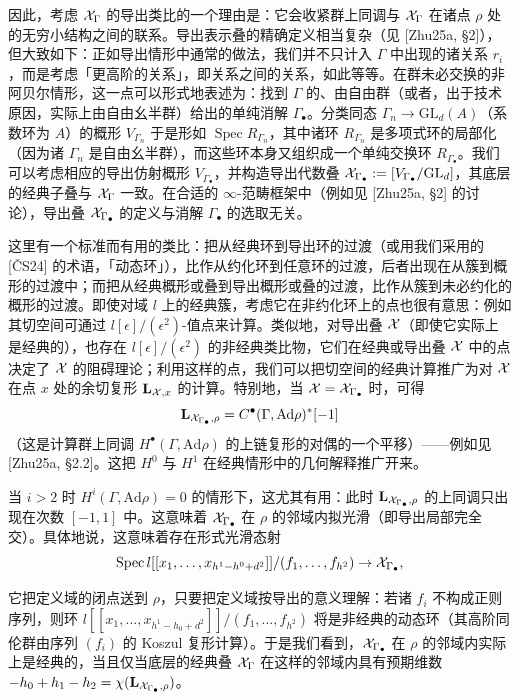 因此，考虑 $\mathcal{X}_\Gamma$ 的导出类比的一个理由是：它会收紧群上同调与 $\mathcal{X}_\Gamma$ 在诸点 $\rho$ 处的无穷小结构之间的联系。导出表示叠的精确定义相当复杂（见 [Zhu25a, §2]），但大致如下：正如导出情形中通常的做法，我们并不只计入 $\Gamma$ 中出现的诸关系 $r_i$，而是考虑「更高阶的关系」，即关系之间的关系，如此等等。在群未必交换的非阿贝尔情形，这一点可以形式地表述为：找到 $\Gamma$ 的、由自由群（或者，出于技术原因，实际上由自由幺半群）给出的单纯消解 $\Gamma_\bullet$。分类同态 $\Gamma_n\to\mathrm{GL}_d(A)$（系数环为 $A$）的概形 $V_{\Gamma_n}$ 于是形如 $\operatorname{Spec}R_{\Gamma_n}$，其中诸环 $R_{\Gamma_n}$ 是多项式环的局部化（因为诸 $\Gamma_n$ 是自由幺半群），而这些环本身又组织成一个单纯交换环 $R_{\Gamma_\bullet}$。我们可以考虑相应的导出仿射概形 $V_{\Gamma_\bullet}$，并构造导出代数叠 $\mathcal{X}_{\Gamma_\bullet}:=[V_{\Gamma_\bullet}/\mathrm{GL}_d]$，其底层的经典子叠与 $\mathcal{X}_\Gamma$ 一致。在合适的 $\infty$-范畴框架中（例如见 [Zhu25a, §2] 的讨论），导出叠 $\mathcal{X}_{\Gamma_\bullet}$ 的定义与消解 $\Gamma_\bullet$ 的选取无关。

这里有一个标准而有用的类比：把从经典环到导出环的过渡（或用我们采用的 [ČS24] 的术语，「动态环」），比作从约化环到任意环的过渡，后者出现在从簇到概形的过渡中；而把从经典概形或叠到导出概形或叠的过渡，比作从簇到未必约化的概形的过渡。即使对域 $l$ 上的经典簇，考虑它在非约化环上的点也很有意思：例如其切空间可通过 $l[\epsilon]/(\epsilon^2)$-值点来计算。类似地，对导出叠 $\mathcal{X}$（即使它实际上是经典的），也存在 $l[\epsilon]/(\epsilon^2)$ 的非经典类比物，它们在经典或导出叠 $\mathcal{X}$ 中的点决定了 $\mathcal{X}$ 的阻碍理论；利用这样的点，我们可以把切空间的经典计算推广为对 $\mathcal{X}$ 在点 $x$ 处的余切复形 $\mathbf L_{\mathcal{X},x}$ 的计算。特别地，当 $\mathcal{X}=\mathcal{X}_{\Gamma_\bullet}$ 时，可得
\[
\mathbf L_{\mathcal{X}_{\Gamma_\bullet},\rho}=C^\bullet(\Gamma,\mathrm{Ad}\rho)^*[-1]
\]
（这是计算群上同调 $H^\bullet(\Gamma,\mathrm{Ad}\rho)$ 的上链复形的对偶的一个平移）——例如见 [Zhu25a, §2.2]。这把 $H^0$ 与 $H^1$ 在经典情形中的几何解释推广开来。

当 $i>2$ 时 $H^i(\Gamma,\mathrm{Ad}\rho)=0$ 的情形下，这尤其有用：此时 $\mathbf L_{\mathcal{X}_{\Gamma_\bullet},\rho}$ 的上同调只出现在次数 $[-1,1]$ 中。这意味着 $\mathcal{X}_{\Gamma_\bullet}$ 在 $\rho$ 的邻域内拟光滑（即导出局部完全交）。具体地说，这意味着存在形式光滑态射
\[
\operatorname{Spec}l[[x_1,\dots,x_{h^1-h^0+d^2}]]/(f_1,\dots,f_{h^2})\to\mathcal{X}_{\Gamma_\bullet},
\]


它把定义域的闭点送到 $\rho$，只要把定义域按导出的意义理解：若诸 $f_i$ 不构成正则序列，则环 $l[[x_1,\dots,x_{h^1-h_0+d^2}]]/(f_1,\dots,f_{h^2})$ 将是非经典的动态环（其高阶同伦群由序列 $(f_i)$ 的 Koszul 复形计算）。于是我们看到，$\mathcal{X}_{\Gamma_\bullet}$ 在 $\rho$ 的邻域内实际上是经典的，当且仅当底层的经典叠 $\mathcal{X}_\Gamma$ 在这样的邻域内具有预期维数 $-h_0+h_1-h_2=\chi(\mathbf L_{\mathcal{X}_{\Gamma_\bullet},\rho})$。

